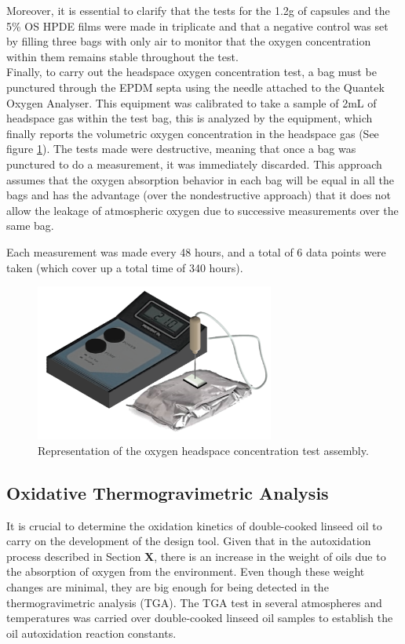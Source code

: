 \begin{refsection}
Moreover, it is essential to clarify that the tests for the 1.2g of capsules and the 5\% OS HPDE films were made in triplicate and that a negative control was set by filling three bags with only air to monitor that the oxygen concentration within them remains stable throughout the test. \\

Finally, to carry out the headspace oxygen concentration test, a bag must be punctured through the EPDM septa using the needle attached to the Quantek Oxygen Analyser. This equipment was calibrated to take a sample of 2mL of headspace gas within the test bag, this is analyzed by the equipment, which finally reports the volumetric oxygen concentration in the headspace gas (See figure \ref{fig:headspace_test_image}). The tests made were destructive, meaning that once a bag was punctured to do a measurement, it was immediately discarded. This approach assumes that the oxygen absorption behavior in each bag will be equal in all the bags and has the advantage (over the nondestructive approach) that it does not allow the leakage of atmospheric oxygen due to successive measurements over the same bag. 


Each measurement was made every 48 hours, and a total of 6 data points were taken (which cover up a total time of 340 hours).

\begin{figure}[h]
    \centering
    \includegraphics[width=0.7\textwidth]{Documento_Latex/Tesis_2/Imagenes/Headspace_test.png}
    \caption{Representation of the oxygen headspace concentration test assembly.}
    \label{fig:headspace_test_image}
\end{figure}
 
\subsection[Oxidative TGA]{Oxidative Thermogravimetric Analysis}\label{sec:TGA} 
It is crucial to determine the oxidation kinetics of double-cooked linseed oil to carry on the development of the design tool. Given that in the autoxidation
process described in Section \textbf{X}, there is an increase in the weight of oils due to the absorption of oxygen from the environment. Even though these weight changes are minimal, they are big enough for being detected in the thermogravimetric analysis (TGA). The TGA test in several atmospheres and temperatures was carried over double-cooked linseed oil samples to establish the oil autoxidation reaction constants.\\



\end{refsection}
